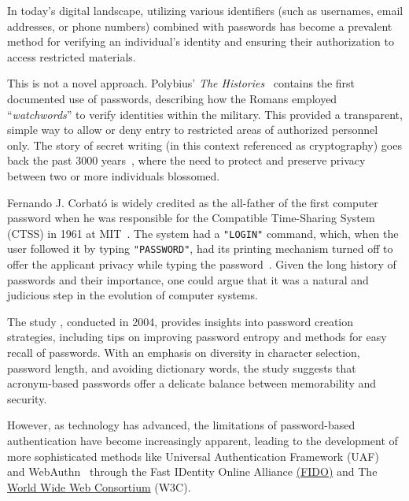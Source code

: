 In today's digital landscape, utilizing various identifiers (such as usernames, email addresses, or phone numbers)
combined with passwords has become a prevalent method for verifying an individual's identity and ensuring
their authorization to access restricted materials.

This is not a novel approach.
Polybius' \textit{The Histories}~\cite{perseus_tufts} contains the first documented use
of passwords, describing
how
the Romans employed ``\textit{watchwords}'' to verify identities within the military.
This provided a transparent, simple way to allow or deny entry to restricted areas of authorized personnel only.
The story of secret writing (in this context referenced as cryptography) goes
back the past 3000 years~\cite{history_cryptography_cryptanalysis}, where the
need to protect and preserve privacy between two or more individuals blossomed.

Fernando J. Corbató is widely credited as the all-father of the first
computer password when he was responsible for the Compatible Time-Sharing
System (CTSS) in 1961 at MIT~\cite{levy1984hackers}.
The system had a \texttt{"LOGIN"} command, which, when the user followed it by
typing \texttt{"PASSWORD"}, had its printing mechanism turned off to offer
the applicant privacy while typing the password~\cite{ctss_programmers_guide}.
Given the long history of passwords and their importance, one could argue that
it was a natural and judicious step in the evolution of computer systems.

The study , conducted in
2004, provides insights into password creation strategies, including tips on
improving password entropy and methods for easy recall of passwords.
With an emphasis on diversity in character selection, password length, and
avoiding dictionary words, the study suggests that acronym-based passwords offer
a delicate balance between memorability and security.

However, as technology has advanced, the limitations of password-based
authentication have become increasingly apparent, leading to the development of
more sophisticated methods like Universal Authentication Framework
(UAF)~\cite{fido_uaf_overview} and WebAuthn~\cite{webauthn_level_2} through the
Fast IDentity Online Alliance \href{https://fidoalliance.org}{(FIDO)} and
The \href{https://www.w3.org}{World Wide Web Consortium} (W3C).

\newcommand{\assymetricCrypto}{\footnote{Asymmetric cryptography uses a key pair consisting of public and private keys. The public key encrypts
data, while the private key decrypts it. The keys are mathematically related, but deriving one from the other
is infeasible, ensuring secure communication and data exchange.}}
\newcommand{\jsonwebLibrary}{\footnote{
    \textbf{Note:} According to the library used to implement
    \href{https://docs.rs/jsonwebtoken/latest/jsonwebtoken/index.html}{jsonwebtokens in Rust}
    it is the private key that encrypts and the public key is responsible for \href{https://docs.rs/jsonwebtoken/latest/jsonwebtoken/struct.DecodingKey.html#method.from_rsa_pem}
    {decrypting}. \textit{Last Accessed: 2023-03-25}.}}


